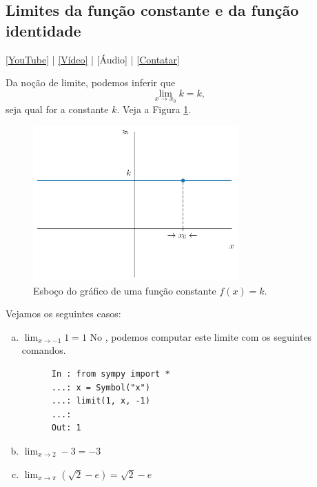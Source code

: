 \subsection{Limites da função constante e da função identidade}\label{sslfc}

\begin{flushright}
  \href{https://youtu.be/_7YiqVx8e8M}{[YouTube]} | \href{https://archive.org/details/lim_fconst_fid}{[Vídeo]} | [Áudio] | \href{https://phkonzen.github.io/notas/contato.html}{[Contatar]}
\end{flushright}

Da noção de limite, podemos inferir que
\begin{equation}
  \lim_{x\to x_0} k = k,
\end{equation}
seja qual for a constante $k$. Veja a Figura \ref{fig:lim_funk}.

\begin{figure}[H]
  \centering
  \includegraphics[width=0.7\textwidth]{./cap_lim/dados/fig_lim_funk/fig_lim_funk}
  \caption{Esboço do gráfico de uma função constante $f(x) = k$.}
  \label{fig:lim_funk}
\end{figure}

\begin{ex}
  Vejamos os seguintes casos:
  \begin{enumerate}[a)]
  \item $\displaystyle \lim_{x\to -1} 1 = 1$
    \ifispython
    No {\python}, podemos computar este limite com os seguintes comandos.
    \begin{lstlisting}
      In : from sympy import *
      ...: x = Symbol("x")
      ...: limit(1, x, -1)
      ...: 
      Out: 1
    \end{lstlisting}
    \fi
  \item $\displaystyle \lim_{x\to 2} -3 = -3$
  \item $\displaystyle \lim_{x\to \pi} \left(\sqrt{2} - e\right) = \sqrt{2}-e$
  \end{enumerate}
\end{ex}


